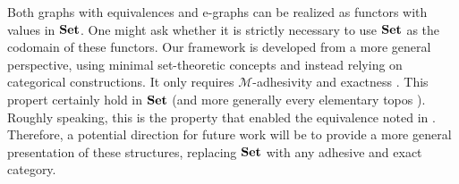 Both graphs with equivalences and e-graphs can be realized as functors with values in $\mathbf{Set}$. One might ask whether it is strictly necessary to use $\mathbf{Set}$ as the codomain of these functors. Our framework is developed from a more general perspective, using minimal set-theoretic concepts and instead relying on categorical constructions. It only requires $\mathcal{M}$-adhesivity and exactness  \cite{barrexact}. This propert certainly hold in $\mathbf{Set}$ (and more generally every elementary topos \cite{maclane2012sheaves}). Roughly speaking, this is  the property that enabled the equivalence noted in . Therefore, a potential direction for future work will be to provide a more general presentation of these structures, replacing $\mathbf{Set}$ with any adhesive and exact category.